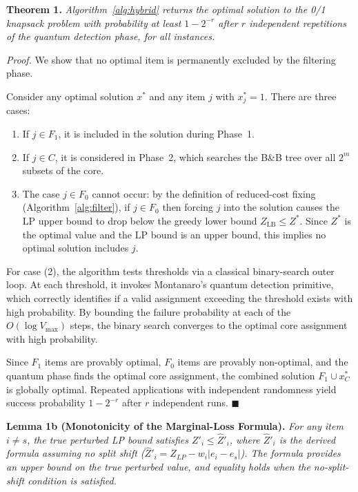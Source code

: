 \documentclass[conference]{IEEEtran} \IEEEoverridecommandlockouts
\begin{document}
\textbf{Theorem 1.} \textit{Algorithm~\ref{alg:hybrid} returns the optimal solution to the 0/1 knapsack problem with probability at least $1 - 2^{-r}$ after $r$ independent repetitions of the quantum detection phase, for all instances.}

\textit{Proof.} We show that no optimal item is permanently excluded by the filtering phase.

Consider any optimal solution $x^*$ and any item $j$ with $x_j^* = 1$. There are three cases:
\begin{enumerate}
    \item If $j \in F_1$, it is included in the solution during Phase~1.
    \item If $j \in C$, it is considered in Phase~2, which searches the B\&B tree over all $2^m$ subsets of the core.
    \item The case $j \in F_0$ cannot occur: by the definition of reduced-cost fixing (Algorithm~\ref{alg:filter}), if $j \in F_0$ then forcing $j$ into the solution causes the LP upper bound to drop below the greedy lower bound $Z_{\text{LB}} \leq Z^*$. Since $Z^*$ is the optimal value and the LP bound is an upper bound, this implies no optimal solution includes $j$.
\end{enumerate}

For case (2), the algorithm tests thresholds via a classical binary-search outer loop. At each threshold, it invokes Montanaro's quantum detection primitive, which correctly identifies if a valid assignment exceeding the threshold exists with high probability. By bounding the failure probability at each of the $O(\log V_{\max})$ steps, the binary search converges to the optimal core assignment with high probability.

Since $F_1$ items are provably optimal, $F_0$ items are provably non-optimal, and the quantum phase finds the optimal core assignment, the combined solution $F_1 \cup x^*_C$ is globally optimal. Repeated applications with independent randomness yield success probability $1 - 2^{-r}$ after $r$ independent runs. \hfill$\blacksquare$

\textbf{Lemma 1b (Monotonicity of the Marginal-Loss Formula).} \label{lem:monotonicity} \textit{For any item $i \ne s$, the true perturbed LP bound satisfies $Z'_i \le \hat{Z}'_i$, where $\hat{Z}'_i$ is the derived formula assuming no split shift ($\hat{Z}'_i = Z_{LP} - w_i |e_i - e_s|$). The formula provides an upper bound on the true perturbed value, and equality holds when the no-split-shift condition is satisfied.}
\end{document}
